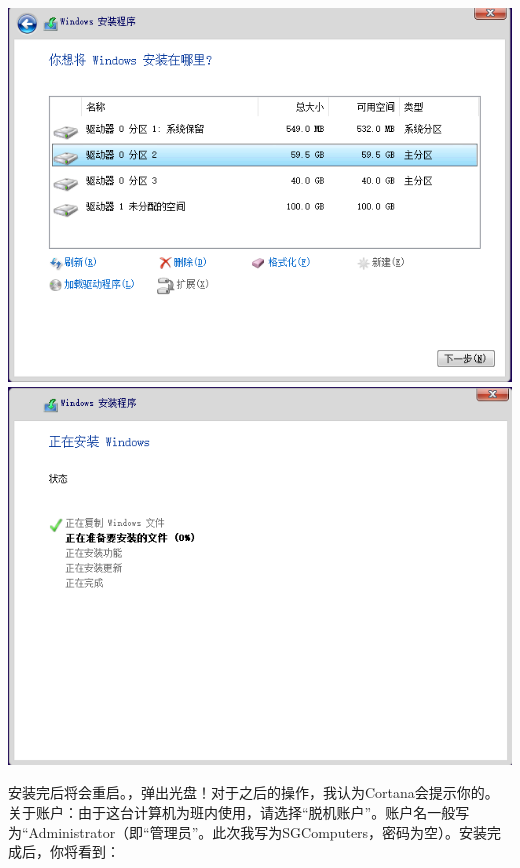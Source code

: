 \begin{center}
	\includegraphics[scale=0.5]{pic/win10setup6}\\	\includegraphics[scale=0.5]{pic/win10setup7}
\end{center} \par
安装完后将会重启。{\color{red}，弹出光盘！}对于之后的操作，我认为Cortana会提示你的。关于账户：由于这台计算机为班内使用，请选择“脱机账户”。账户名一般写为“Administrator（即“管理员”。此次我写为SGComputers，密码为空）。安装完成后，你将看到：
